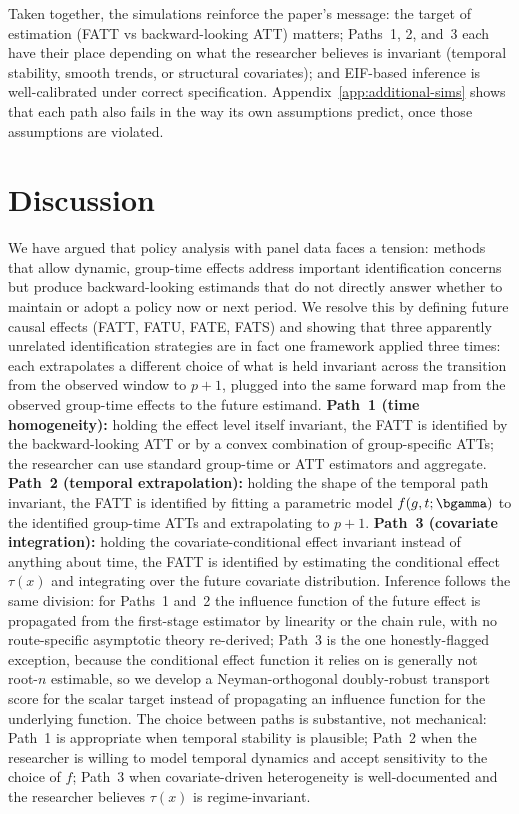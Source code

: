 \documentclass{article}
\begin{document}
Taken together, the simulations reinforce the paper's message: the target of estimation (FATT vs backward-looking ATT) matters; Paths~1, 2, and~3 each have their place depending on what the researcher believes is invariant (temporal stability, smooth trends, or structural covariates); and EIF-based inference is well-calibrated under correct specification. Appendix~\ref{app:additional-sims} shows that each path also fails in the way its own assumptions predict, once those assumptions are violated.





\section{Discussion}\label{sec:discussion}

We have argued that policy analysis with panel data faces a tension: methods that allow dynamic, group-time effects address important identification concerns but produce backward-looking estimands that do not directly answer whether to maintain or adopt a policy now or next period. We resolve this by defining future causal effects (FATT, FATU, FATE, FATS) and showing that three apparently unrelated identification strategies are in fact one framework applied three times: each extrapolates a different choice of what is held invariant across the transition from the observed window to $p+1$, plugged into the same forward map from the observed group-time effects to the future estimand. \textbf{Path~1 (time homogeneity):} holding the effect level itself invariant, the FATT is identified by the backward-looking ATT or by a convex combination of group-specific ATTs; the researcher can use standard group-time or ATT estimators and aggregate. \textbf{Path~2 (temporal extrapolation):} holding the shape of the temporal path invariant, the FATT is identified by fitting a parametric model $f(g,t;\bgamma)$ to the identified group-time ATTs and extrapolating to $p+1$. \textbf{Path~3 (covariate integration):} holding the covariate-conditional effect invariant instead of anything about time, the FATT is identified by estimating the conditional effect $\tau(x)$ and integrating over the future covariate distribution. Inference follows the same division: for Paths~1 and~2 the influence function of the future effect is propagated from the first-stage estimator by linearity or the chain rule, with no route-specific asymptotic theory re-derived; Path~3 is the one honestly-flagged exception, because the conditional effect function it relies on is generally not root-$n$ estimable, so we develop a Neyman-orthogonal doubly-robust transport score for the scalar target instead of propagating an influence function for the underlying function. The choice between paths is substantive, not mechanical: Path~1 is appropriate when temporal stability is plausible; Path~2 when the researcher is willing to model temporal dynamics and accept sensitivity to the choice of $f$; Path~3 when covariate-driven heterogeneity is well-documented and the researcher believes $\tau(x)$ is regime-invariant.
\end{document}
